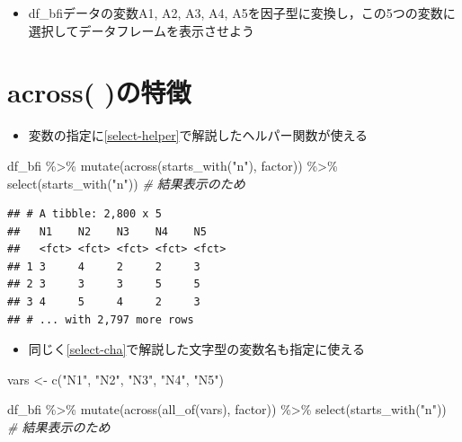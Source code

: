 \documentclass[
  xelatex,ja=standard, b5paper]{bxjsbook}
\newenvironment{Shaded}{\begin{snugshade}}{\end{snugshade}}
\newcommand{\CommentTok}[1]{\textcolor[rgb]{0.56,0.35,0.01}{\textit{#1}}}
\newcommand{\FunctionTok}[1]{\textcolor[rgb]{0.00,0.00,0.00}{#1}}
\newcommand{\NormalTok}[1]{#1}
\newcommand{\OtherTok}[1]{\textcolor[rgb]{0.56,0.35,0.01}{#1}}
\newcommand{\SpecialCharTok}[1]{\textcolor[rgb]{0.00,0.00,0.00}{#1}}
\newcommand{\StringTok}[1]{\textcolor[rgb]{0.31,0.60,0.02}{#1}}
\providecommand{\tightlist}{%
  \setlength{\itemsep}{0pt}\setlength{\parskip}{0pt}}
\begin{document}
\begin{itemize}
\tightlist
\item
  df\_bfiデータの変数A1, A2, A3, A4, A5を因子型に変換し，この5つの変数に選択してデータフレームを表示させよう
\end{itemize}

\hypertarget{mu-across}{%
\section{across( )の特徴}\label{mu-across}}

\begin{itemize}
\tightlist
\item
  変数の指定に\ref{select-helper}で解説したヘルパー関数が使える
\end{itemize}

\begin{Shaded}
\begin{Highlighting}[]
\NormalTok{df\_bfi }\SpecialCharTok{\%\textgreater{}\%}
  \FunctionTok{mutate}\NormalTok{(}\FunctionTok{across}\NormalTok{(}\FunctionTok{starts\_with}\NormalTok{(}\StringTok{"n"}\NormalTok{),}
\NormalTok{                factor)) }\SpecialCharTok{\%\textgreater{}\%} 
  \FunctionTok{select}\NormalTok{(}\FunctionTok{starts\_with}\NormalTok{(}\StringTok{"n"}\NormalTok{))   }\CommentTok{\# 結果表示のため}
\end{Highlighting}
\end{Shaded}

\begin{verbatim}
## # A tibble: 2,800 x 5
##   N1    N2    N3    N4    N5   
##   <fct> <fct> <fct> <fct> <fct>
## 1 3     4     2     2     3    
## 2 3     3     3     5     5    
## 3 4     5     4     2     3    
## # ... with 2,797 more rows
\end{verbatim}

\begin{itemize}
\tightlist
\item
  同じく\ref{select-cha}で解説した文字型の変数名も指定に使える
\end{itemize}

\begin{Shaded}
\begin{Highlighting}[]
\NormalTok{vars }\OtherTok{\textless{}{-}} \FunctionTok{c}\NormalTok{(}\StringTok{"N1"}\NormalTok{, }\StringTok{"N2"}\NormalTok{, }\StringTok{"N3"}\NormalTok{, }\StringTok{"N4"}\NormalTok{, }\StringTok{"N5"}\NormalTok{)}

\NormalTok{df\_bfi }\SpecialCharTok{\%\textgreater{}\%}
  \FunctionTok{mutate}\NormalTok{(}\FunctionTok{across}\NormalTok{(}\FunctionTok{all\_of}\NormalTok{(vars),}
\NormalTok{                factor)) }\SpecialCharTok{\%\textgreater{}\%} 
  \FunctionTok{select}\NormalTok{(}\FunctionTok{starts\_with}\NormalTok{(}\StringTok{"n"}\NormalTok{))   }\CommentTok{\# 結果表示のため}
\end{Highlighting}
\end{Shaded}
\end{document}
